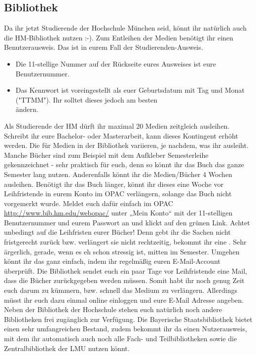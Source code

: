 \subsection{Bibliothek}
Da ihr jetzt Studierende der Hochschule München seid, könnt ihr 
natürlich auch die HM-Bibliothek nutzen :-).
Zum Entleihen der Medien benötigt ihr einen Benutzerausweis. Das ist 
in eurem Fall der Studierenden-Ausweis.
\begin{itemize}
\item Die 11-stellige Nummer auf der Rückseite eures Ausweises ist eure 
Benutzernummer. 
\item Das Kennwort ist voreingestellt als euer Geburtsdatum mit Tag und 
Monat ("TTMM"). Ihr solltet dieses jedoch am besten\\ ändern. 
\end{itemize}
Als Studierende der HM dürft ihr maximal 20 Medien zeitgleich 
ausleihen. Schreibt ihr eure Bachelor- oder Masterarbeit, kann dieses 
Kontingent erhöht werden. Die  für Medien in der Bibliothek
variieren, je nachdem, was ihr ausleiht. Manche Bücher sind zum 
Beispiel mit dem Aufkleber \glqq Semesterleihe\grqq{} gekennzeichnet - sehr 
praktisch für euch, denn so könnt ihr das Buch das ganze Semester 
lang nutzen. Anderenfalls könnt ihr die Medien/Bücher 4 Wochen 
ausleihen. Benötigt ihr das Buch länger, könnt ihr dieses eine Woche 
vor Leihfristende in eurem Konto im OPAC verlängern, solange das 
Buch nicht vorgemerkt wurde. Meldet euch dafür einfach im OPAC \url{http://www.bib.hm.edu/webopac/}
unter „Mein Konto“ mit der 11-stelligen Benutzernummer und eurem 
Passwort an und klickt auf den grünen Link.\doublebreak
Achtet unbedingt auf die Leihfristen eurer Bücher! Denn gebt ihr die 
Sachen nicht fristgerecht zurück bzw. verlängert sie nicht rechtzeitig, 
bekommt ihr eine . Sehr ärgerlich,
gerade, wenn es eh schon stressig ist, mitten im Semester. \doublebreak
Umgehen könnt ihr das ganz einfach, indem ihr regelmäßig euren 
E-Mail-Account überprüft. Die Bibliothek sendet euch ein paar Tage 
vor Leihfristende eine Mail, dass die Bücher zurückgegeben werden 
müssen. Somit habt ihr noch genug Zeit euch darum zu kümmern, 
bzw. schnell das Medium zu verlängern. Allerdings müsst ihr euch dazu 
einmal online einloggen und eure E-Mail Adresse angeben.\doublebreak
Neben der Bibliothek der Hochschule stehen euch natürlich noch 
andere Bibliotheken frei zugänglich zur Verfügung. Die Bayerische 
Staatsbibliothek bietet einen sehr umfangreichen Bestand, zudem 
bekommt ihr da einen Nutzerausweis, mit dem ihr automatisch auch 
noch alle Fach- und Teilbibliotheken sowie die 
Zentralbibliothek der LMU nutzen könnt.
